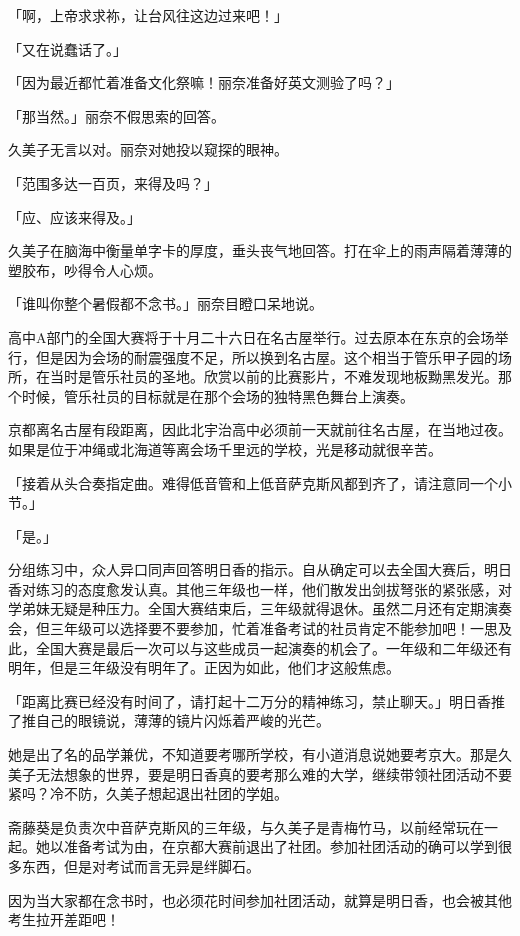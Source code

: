 \documentclass[UTF8]{ctexart}
\begin{document}
    「啊，上帝求求祢，让台风往这边过来吧！」 

    「又在说蠢话了。」 

    「因为最近都忙着准备文化祭嘛！丽奈准备好英文测验了吗？」 

    「那当然。」丽奈不假思索的回答。 

    久美子无言以对。丽奈对她投以窥探的眼神。 

    「范围多达一百页，来得及吗？」 

    「应、应该来得及。」 

    久美子在脑海中衡量单字卡的厚度，垂头丧气地回答。打在伞上的雨声隔着薄薄的塑胶布，吵得令人心烦。 

    「谁叫你整个暑假都不念书。」丽奈目瞪口呆地说。 

    高中A部门的全国大赛将于十月二十六日在名古屋举行。过去原本在东京的会场举行，但是因为会场的耐震强度不足，所以换到名古屋。这个相当于管乐甲子园的场所，在当时是管乐社员的圣地。欣赏以前的比赛影片，不难发现地板黝黑发光。那个时候，管乐社员的目标就是在那个会场的独特黑色舞台上演奏。 

    京都离名古屋有段距离，因此北宇治高中必须前一天就前往名古屋，在当地过夜。如果是位于冲绳或北海道等离会场千里远的学校，光是移动就很辛苦。 

    「接着从头合奏指定曲。难得低音管和上低音萨克斯风都到齐了，请注意同一个小节。」 

    「是。」 

    分组练习中，众人异口同声回答明日香的指示。自从确定可以去全国大赛后，明日香对练习的态度愈发认真。其他三年级也一样，他们散发出剑拔弩张的紧张感，对学弟妹无疑是种压力。全国大赛结束后，三年级就得退休。虽然二月还有定期演奏会，但三年级可以选择要不要参加，忙着准备考试的社员肯定不能参加吧！一思及此，全国大赛是最后一次可以与这些成员一起演奏的机会了。一年级和二年级还有明年，但是三年级没有明年了。正因为如此，他们才这般焦虑。 

    「距离比赛已经没有时间了，请打起十二万分的精神练习，禁止聊天。」明日香推了推自己的眼镜说，薄薄的镜片闪烁着严峻的光芒。 

    她是出了名的品学兼优，不知道要考哪所学校，有小道消息说她要考京大。那是久美子无法想象的世界，要是明日香真的要考那么难的大学，继续带领社团活动不要紧吗？冷不防，久美子想起退出社团的学姐。 

    斋藤葵是负责次中音萨克斯风的三年级，与久美子是青梅竹马，以前经常玩在一起。她以准备考试为由，在京都大赛前退出了社团。参加社团活动的确可以学到很多东西，但是对考试而言无异是绊脚石。 

    因为当大家都在念书时，也必须花时间参加社团活动，就算是明日香，也会被其他考生拉开差距吧！ 
\end{document}
